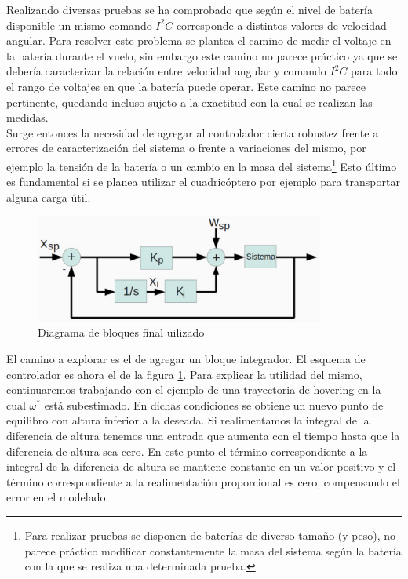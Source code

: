 \documentclass[main]{subfiles}
\begin{document}
Realizando diversas pruebas se ha comprobado que seg\'un el nivel de bater\'ia disponible un mismo comando $I^2C$ corresponde a distintos valores de velocidad angular. Para resolver este problema se plantea el camino de medir el voltaje en la bater\'ia durante el vuelo, sin embargo este camino no parece pr\'actico ya que se deber\'ia caracterizar la relaci\'on entre velocidad angular y comando $I^2C$ para todo el rango de voltajes en que la bater\'ia puede operar. Este camino no parece pertinente, quedando incluso sujeto a la exactitud con la cual se realizan las medidas.\\

Surge entonces la necesidad de agregar al controlador cierta robustez frente a errores de caracterizaci\'on del sistema o frente a variaciones del mismo, por ejemplo la tensi\'on de la bater\'ia o un cambio en la masa del sistema\footnote{Para realizar pruebas se disponen de bater\'ias de diverso tamaño (y peso), no parece pr\'actico modificar constantemente la masa del sistema seg\'un la bater\'ia con la que se realiza una determinada prueba.} Esto \'ultimo es fundamental si se planea utilizar el cuadric\'optero por ejemplo para transportar alguna carga \'util.\\

\begin{figure}[h!]
	\centering
	\vspace{-20pt}
	\includegraphics[width=0.85\textwidth]{./pics_control/diagrama_bloques_completo.pdf}
	\caption{Diagrama de bloques final uilizado}
	\label{fig:bloque2}
\end{figure}

El camino a explorar es el de agregar un bloque integrador. El esquema de controlador es ahora el de la figura \ref{fig:bloque2}. Para explicar la utilidad del mismo, continuaremos trabajando con el ejemplo de una trayectoria de hovering en la cual $\omega^*$ est\'a subestimado. En dichas condiciones se obtiene un nuevo punto de equilibro con altura inferior a la deseada. Si realimentamos la integral de la diferencia de altura tenemos una entrada que aumenta con el tiempo hasta que la diferencia de altura sea cero. En este punto el t\'ermino correspondiente a la integral de la diferencia de altura se mantiene constante en un valor positivo y el t\'ermino correspondiente a la realimentaci\'on proporcional es cero, compensando el error en el modelado.\\
\end{document}
